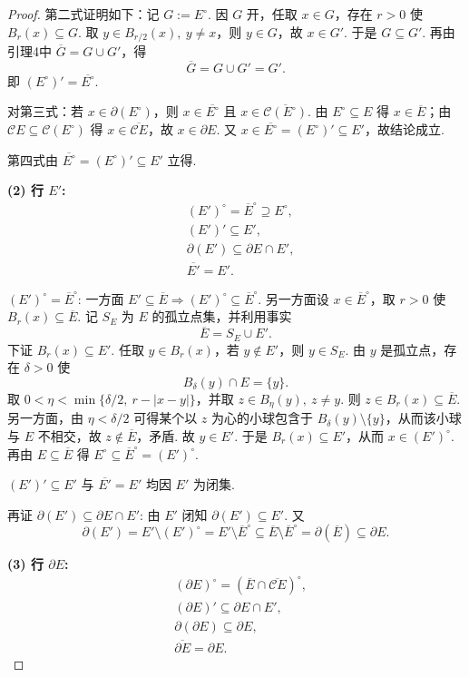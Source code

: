 \begin{3b}
\begin{enumerate}
\begin{proof}
第二式证明如下：记 $G:=E^\circ$.
因 $G$ 开，任取 $x\in G$，存在 $r>0$ 使 $B_r(x)\subseteq G$.
取 $y\in B_{r/2}(x),\ y\neq x$，则 $y\in G$，故 $x\in G'$.
于是 $G\subseteq G'$.
再由引理4中 $\overline{G}=G\cup G'$，得
\[
\overline{G}=G\cup G'=G'.
\]
即 $(E^\circ)'=\overline{E^\circ}$.

对第三式：若 $x\in\partial(E^\circ)$，则 $x\in\overline{E^\circ}$ 且 $x\in\overline{\mathscr{C}(E^\circ)}$.
由 $E^\circ\subseteq E$ 得 $x\in\overline{E}$；由 $\mathscr{C}E\subseteq \mathscr{C}(E^\circ)$ 得
$x\in\overline{\mathscr{C}E}$，故 $x\in\partial E$.
又 $x\in\overline{E^\circ}=(E^\circ)'\subseteq E'$，故结论成立.

第四式由 $\overline{E^\circ}=(E^\circ)'\subseteq E'$ 立得.

\textbf{(2) 行 $E'$:}
\begin{align*}
&(E')^\circ=\overline{E}^\circ\supseteq E^\circ,\\
&(E')'\subseteq E',\\
&\partial(E')\subseteq \partial E\cap E',\\
&\overline{E'}=E'.
\end{align*}

$(E')^\circ=\overline{E}^\circ$:
一方面 $E'\subseteq\overline{E}\Rightarrow (E')^\circ\subseteq\overline{E}^\circ$.
另一方面设 $x\in\overline{E}^\circ$，取 $r>0$ 使 $B_r(x)\subseteq\overline{E}$.
记 $S_E$ 为 $E$ 的孤立点集，并利用事实
\[
\overline{E}=S_E\cup E'.
\]
下证 $B_r(x)\subseteq E'$.
任取 $y\in B_r(x)$，若 $y\notin E'$，则 $y\in S_E$.
由 $y$ 是孤立点，存在 $\delta>0$ 使
\[
B_\delta(y)\cap E=\{y\}.
\]
取 $0<\eta<\min\{\delta/2,\ r-|x-y|\}$，并取 $z\in B_\eta(y),\ z\neq y$.
则 $z\in B_r(x)\subseteq\overline{E}$.
另一方面，由 $\eta<\delta/2$ 可得某个以 $z$ 为心的小球包含于
$B_\delta(y)\setminus\{y\}$，从而该小球与 $E$ 不相交，故 $z\notin\overline{E}$，矛盾.
故 $y\in E'$.
于是 $B_r(x)\subseteq E'$，从而 $x\in(E')^\circ$.
再由 $E\subseteq\overline{E}$ 得 $E^\circ\subseteq\overline{E}^\circ=(E')^\circ$.

$(E')'\subseteq E'$ 与 $\overline{E'}=E'$ 均因 $E'$ 为闭集.

再证 $\partial(E')\subseteq\partial E\cap E'$:
由 $E'$ 闭知 $\partial(E')\subseteq E'$.
又
\[
\partial(E')=E'\setminus(E')^\circ
=E'\setminus\overline{E}^\circ
\subseteq \overline{E}\setminus\overline{E}^\circ
=\partial(\overline{E})\subseteq\partial E.
\]

\textbf{(3) 行 $\partial E$:}
\begin{align*}
& (\partial E)^\circ=(\overline{E}\cap\overline{\mathscr{C}E})^\circ,\\
& (\partial E)'\subseteq\partial E\cap E',\\
& \partial(\partial E)\subseteq\partial E,\\
& \overline{\partial E}=\partial E.
\end{align*}


\end{proof}
\end{enumerate}
\end{3b}
